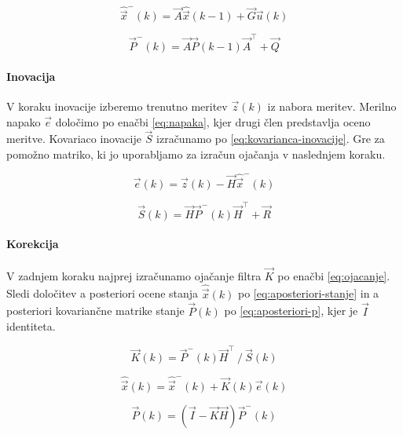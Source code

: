 \begin{equation}
	\hat{\vec{x}}^-(k) = \vec{A} \hat{\vec{x}}(k-1) + \vec{G} \vec{u}(k)
    \label{eq:ocena-stanja}
\end{equation}

\begin{equation}
	\vec{P}^-(k) = \vec{A} \vec{P}(k-1) \vec{A}^\top + \vec{Q}
    \label{eq:apriori-p}
\end{equation}

\paragraph{Inovacija}
V koraku inovacije izberemo trenutno meritev $\vec{z}(k)$ iz nabora meritev. Merilno napako $\vec{e}$ določimo po enačbi \eqref{eq:napaka}, kjer drugi člen predstavlja oceno meritve. Kovariaco inovacije $\vec{S}$ izračunamo po \eqref{eq:kovarianca-inovacije}. Gre za pomožno matriko, ki jo uporabljamo za izračun ojačanja v naslednjem koraku.

\begin{equation}
	\vec{e}(k) = \vec{z}(k) - \vec{H} \hat{\vec{x}}^-(k)
    \label{eq:napaka}
\end{equation}

\begin{equation}
\vec{S}(k) = \vec{H} \vec{P}^-(k) \vec{H}^\top + \vec{R}
\label{eq:kovarianca-inovacije}
\end{equation}

\paragraph{Korekcija}
V zadnjem koraku najprej izračunamo ojačanje filtra $\vec{K}$ po enačbi \eqref{eq:ojacanje}. Sledi določitev a posteriori ocene stanja $\hat{\vec{x}}(k)$ po \eqref{eq:aposteriori-stanje} in a posteriori kovariančne matrike stanje $\vec{P}(k)$ po \eqref{eq:aposteriori-p}, kjer je $\vec{I}$ identiteta.

\begin{equation}
\vec{K}(k) = {\vec{P}^-(k) \vec{H}^\top} ~/~ {\vec{S}(k)}
\label{eq:ojacanje}
\end{equation}

\begin{equation}
\hat{\vec{x}}(k) = \hat{\vec{x}}^-(k) + \vec{K}(k) \vec{e}(k)
\label{eq:aposteriori-stanje}
\end{equation}

\begin{equation}
\vec{P}(k) = \left( \vec{I} - \vec{K} \vec{H} \right) \vec{P}^-(k)
\label{eq:aposteriori-p}
\end{equation}








